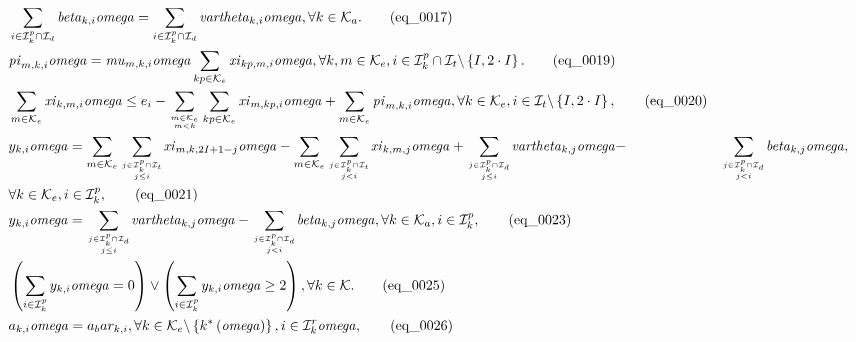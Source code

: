 \begin{align}
  & \sum_{i \in \mathcal{I}_{k}^{p} \cap \mathcal{I}_{d}} \mathit{beta}_{k , i} \mathit{omega} = \sum_{i \in \mathcal{I}_{k}^{p} \cap \mathcal{I}_{d}} \mathit{vartheta}_{k , i} \mathit{omega} , \forall k \in \mathcal{K}_{a} . \tag{eq\_0017} \\
  & \mathit{pi}_{m , k , i} \mathit{omega} = \mathit{mu}_{m , k , i} \mathit{omega} \sum_{kp \in \mathcal{K}_{e}} \mathit{xi}_{kp , m , i} \mathit{omega} , \forall k , m \in \mathcal{K}_{e} , i \in \mathcal{I}_{k}^{p} \cap \mathcal{I}_{t} \backslash \left\{I , 2 \cdot I\right\} . \tag{eq\_0019} \\
  & \sum_{m \in \mathcal{K}_{e}} \mathit{xi}_{k , m , i} \mathit{omega} \leq e_{i} - \underset{\genfrac{}{}{0pt}{}{m \in \mathcal{K}_{e}}{m < k}}{\sum} \sum_{kp \in \mathcal{K}_{e}} \mathit{xi}_{m , kp , i} \mathit{omega} + \sum_{m \in \mathcal{K}_{e}} \mathit{pi}_{m , k , i} \mathit{omega} , \forall k \in \mathcal{K}_{e} , i \in \mathcal{I}_{t} \backslash \left\{I , 2 \cdot I\right\} , \tag{eq\_0020} \\
  &  y_{k , i} \mathit{omega} = \sum_{m \in \mathcal{K}_{e}} \underset{\genfrac{}{}{0pt}{}{j \in \mathcal{I}_{k}^{p} \cap \mathcal{I}_{t}}{j \leq i}}{\sum} \mathit{xi}_{m , k , 2 I + 1 - j} \mathit{omega} - \sum_{m \in \mathcal{K}_{e}} \underset{\genfrac{}{}{0pt}{}{j \in \mathcal{I}_{k}^{p} \cap \mathcal{I}_{t}}{j < i}}{\sum} \mathit{xi}_{k , m , j} \mathit{omega} + \underset{\genfrac{}{}{0pt}{}{j \in \mathcal{I}_{k}^{p} \cap \mathcal{I}_{d}}{j \leq i}}{\sum} \mathit{vartheta}_{k , j} \mathit{omega} - & \underset{\genfrac{}{}{0pt}{}{j \in \mathcal{I}_{k}^{p} \cap \mathcal{I}_{d}}{j < i}}{\sum} \mathit{beta}_{k , j} \mathit{omega} , \\ & \forall k \in \mathcal{K}_{e} , i \in \mathcal{I}_{k}^{p} ,  \tag{eq\_0021} \\
  & y_{k , i} \mathit{omega} = \underset{\genfrac{}{}{0pt}{}{j \in \mathcal{I}_{k}^{p} \cap \mathcal{I}_{d}}{j \leq i}}{\sum} \mathit{vartheta}_{k , j} \mathit{omega} - \underset{\genfrac{}{}{0pt}{}{j \in \mathcal{I}_{k}^{p} \cap \mathcal{I}_{d}}{j < i}}{\sum} \mathit{beta}_{k , j} \mathit{omega} , \forall k \in \mathcal{K}_{a} , i \in \mathcal{I}_{k}^{p} , \tag{eq\_0023} \\
  & \left(\sum_{i \in \mathcal{I}_{k}^{p}} y_{k , i} \mathit{omega} = 0\right) \lor \left(\sum_{i \in \mathcal{I}_{k}^{p}} y_{k , i} \mathit{omega} \geq 2\right) , \forall k \in \mathcal{K} . \tag{eq\_0025} \\
  & a_{k , i} \mathit{omega} = a_bar_{k , i} , \forall k \in \mathcal{K}_{e} \backslash \left\{k^{*} \left(\mathit{omega}\right)\right\} , i \in \mathcal{I}_{k}^{r} \mathit{omega} , \tag{eq\_0026} \\

\end{align}
